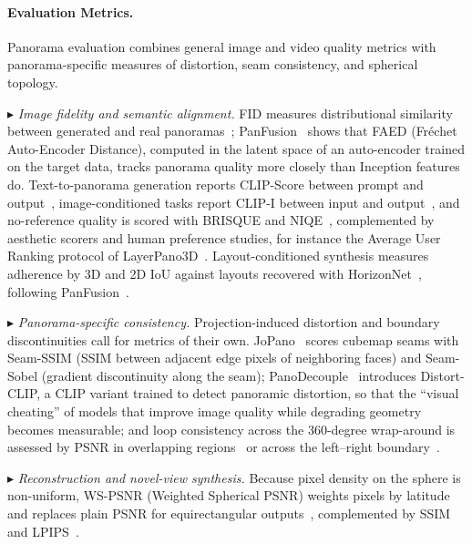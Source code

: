 \paragraph{Evaluation Metrics.}
Panorama evaluation combines general image and video quality metrics with panorama-specific measures of distortion, seam consistency, and spherical topology.

$\blacktriangleright$ \textit{Image fidelity and semantic alignment.} FID measures distributional similarity between generated and real panoramas~\cite{feng2025jopano,yang2024layerpano3d,zheng2025panorama,tandit2025}; PanFusion~\cite{zhang2024taming} shows that FAED (Fréchet Auto-Encoder Distance), computed in the latent space of an auto-encoder trained on the target data, tracks panorama quality more closely than Inception features do.
Text-to-panorama generation reports CLIP-Score between prompt and output~\cite{team2025hunyuanworld,feng2025jopano,yang2024layerpano3d,tandit2025}, image-conditioned tasks report CLIP-I between input and output~\cite{team2025hunyuanworld}, and no-reference quality is scored with BRISQUE and NIQE~\cite{team2025hunyuanworld,yang2024layerpano3d,yang2025matrix}, complemented by aesthetic scorers and human preference studies, for instance the Average User Ranking protocol of LayerPano3D~\cite{yang2024layerpano3d}.
Layout-conditioned synthesis measures adherence by 3D and 2D IoU against layouts recovered with HorizonNet~\cite{sun2019horizonnet}, following PanFusion~\cite{zhang2024taming}.

$\blacktriangleright$ \textit{Panorama-specific consistency.} Projection-induced distortion and boundary discontinuities call for metrics of their own.
JoPano~\cite{feng2025jopano} scores cubemap seams with Seam-SSIM (SSIM between adjacent edge pixels of neighboring faces) and Seam-Sobel (gradient discontinuity along the seam); PanoDecouple~\cite{zheng2025panorama} introduces Distort-CLIP, a CLIP variant trained to detect panoramic distortion, so that the ``visual cheating'' of models that improve image quality while degrading geometry becomes measurable; and loop consistency across the 360-degree wrap-around is assessed by PSNR in overlapping regions~\cite{tang2023MVDiffusion} or across the left--right boundary~\cite{panflow,xia2025panowan}.

$\blacktriangleright$ \textit{Reconstruction and novel-view synthesis.} Because pixel density on the sphere is non-uniform, WS-PSNR (Weighted Spherical PSNR) weights pixels by latitude and replaces plain PSNR for equirectangular outputs~\cite{pansplat,chen2023panogrf}, complemented by SSIM and LPIPS~\cite{yang2024layerpano3d,pansplat,yang2025matrix}.

